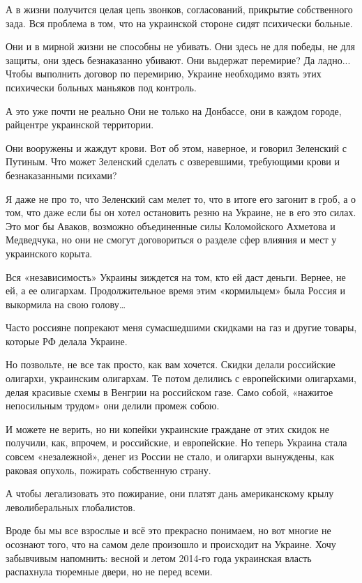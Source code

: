 \documentclass[a4paper,11pt]{extreport}
\begin{document}
А в жизни получится целая цепь звонков, согласований, прикрытие собственного зада.
Вся проблема в том, что на украинской стороне сидят психически больные.

Они и в мирной жизни не способны не убивать.
Они здесь не для победы, не для защиты, они здесь безнаказанно убивают. Они выдержат перемирие?
Да ладно...
Чтобы выполнить договор по перемирию, Украине необходимо взять этих психически больных маньяков под контроль.

А это уже почти не реально
Они не только на Донбассе, они в каждом городе, райцентре украинской территории.

Они вооружены и жаждут крови.
Вот об этом, наверное, и говорил Зеленский с Путиным.
Что может Зеленский сделать с озверевшими, требующими крови и безнаказанными психами?

Я даже не про то, что Зеленский сам мелет то, что в итоге его загонит в гроб, а о том, что даже если бы он хотел остановить резню на Украине, не в его это силах.
Это мог бы Аваков, возможно объединенные силы Коломойского Ахметова и Медведчука, но они не смогут договориться о разделе сфер влияния и мест у украинского корыта.

Вся «независимость» Украины зиждется на том, кто ей даст деньги.
Вернее, не ей, а ее олигархам.
Продолжительное время этим «кормильцем» была Россия и выкормила на свою голову…

Часто россияне попрекают меня сумасшедшими скидками на газ и другие товары, которые РФ делала Украине.

Но позвольте, не все так просто, как вам хочется. Скидки делали российские олигархи, украинским олигархам.
Те потом делились с европейскими олигархами, делая красивые схемы в Венгрии на российском газе. Само собой, «нажитое непосильным трудом» они делили промеж собою.

И можете не верить, но ни копейки украинские граждане от этих скидок не получили, как, впрочем, и российские, и европейские.
Но теперь Украина стала совсем «незалежной», денег из России не стало, и олигархи вынуждены, как раковая опухоль, пожирать собственную страну.

А чтобы легализовать это пожирание, они платят дань американскому крылу леволиберальных глобалистов.

Вроде бы мы все взрослые и всё это прекрасно понимаем, но вот многие не осознают того, что на самом деле произошло и происходит на Украине.
Хочу забывчивым напомнить:
весной и летом 2014-го года украинская власть распахнула тюремные двери, но не перед всеми.
\end{document}
